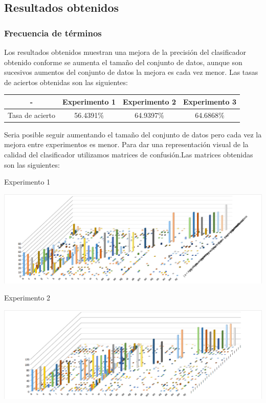 \subsection{Resultados obtenidos}
\label{subsec:resj48}
\subsubsection{Frecuencia de términos}
Los resultados obtenidos muestran una mejora de la precisión del clasificador obtenido conforme se aumenta el tamaño del conjunto de datos, aunque son sucesivos aumentos del conjunto de datos la mejora es cada vez menor. Las tasas de aciertos obtenidas son las siguientes:
\vspace{1em}
\begin{center}
\begin{tabular}{|c|c|c|c|}
\hline 
- & Experimento 1 & Experimento 2 & Experimento 3 \\ 
\hline 
Tasa de acierto & 56.4391\% & 64.9397\% & 64.6868\% \\ 
\hline 
\end{tabular} 
\end{center}
\vspace{1em}
Seria posible seguir aumentando el tamaño del conjunto de datos pero cada vez la mejora entre experimentos es menor.
Para dar una representación visual de la calidad del clasificador utilizamos matrices de confusión.Las matrices obtenidas son las siguientes:

Experimento 1
\begin{center}
\includegraphics[width=\textwidth]{j48/PART_80_CV10.png} 
\end{center}

Experimento 2
\begin{center}
\includegraphics[width=\textwidth]{j48/PART_125_CV15.png} 
\end{center}

